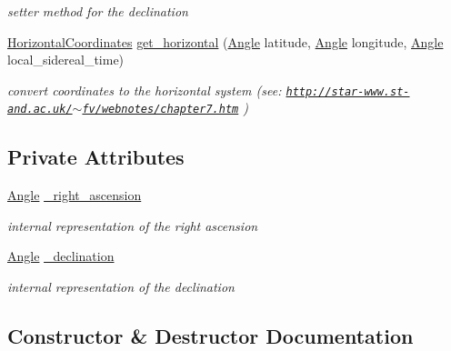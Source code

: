 \begin{DoxyCompactItemize}
\begin{DoxyCompactList}\small\item\em setter method for the declination \end{DoxyCompactList}\item 
\mbox{\hyperlink{classHorizontalCoordinates}{Horizontal\+Coordinates}} \mbox{\hyperlink{classEquatorialCoordinates_a8e829ee947df5d5d823c4a25417de75c}{get\+\_\+horizontal}} (\mbox{\hyperlink{classAngle}{Angle}} latitude, \mbox{\hyperlink{classAngle}{Angle}} longitude, \mbox{\hyperlink{classAngle}{Angle}} local\+\_\+sidereal\+\_\+time)
\begin{DoxyCompactList}\small\item\em convert coordinates to the horizontal system (see\+: \href{http://star-www.st-and.ac.uk/~fv/webnotes/chapter7.htm}{\tt http\+://star-\/www.\+st-\/and.\+ac.\+uk/$\sim$fv/webnotes/chapter7.\+htm} ) \end{DoxyCompactList}\end{DoxyCompactItemize}
\subsection*{Private Attributes}
\begin{DoxyCompactItemize}
\item 
\mbox{\label{classEquatorialCoordinates_ac8567b85d8e8818a44882198e2cac54c}} 
\mbox{\hyperlink{classAngle}{Angle}} \mbox{\hyperlink{classEquatorialCoordinates_ac8567b85d8e8818a44882198e2cac54c}{\+\_\+right\+\_\+ascension}}
\begin{DoxyCompactList}\small\item\em internal representation of the right ascension \end{DoxyCompactList}\item 
\mbox{\label{classEquatorialCoordinates_a424d605f2710fd158602b800e77a9882}} 
\mbox{\hyperlink{classAngle}{Angle}} \mbox{\hyperlink{classEquatorialCoordinates_a424d605f2710fd158602b800e77a9882}{\+\_\+declination}}
\begin{DoxyCompactList}\small\item\em internal representation of the declination \end{DoxyCompactList}\end{DoxyCompactItemize}


\subsection{Constructor \& Destructor Documentation}
\mbox{\label{classEquatorialCoordinates_a4a147efb5882e12d1f8bc5cacd0e51a7}} 
